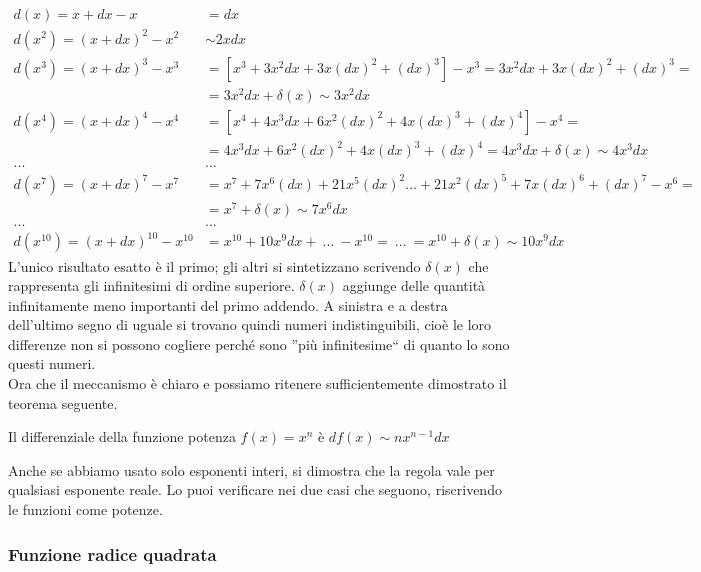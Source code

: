 \begin{align*}
  d(x)=x+dx-x & =dx\\
  d(x^2)=(x+dx)^2-x^2 & \sim 2xdx\\
  d(x^3)=(x+dx)^3-x^3 & =[x^3+3x^2dx+3x(dx)^2+(dx)^3]-x^3=
                      3x^2dx+3x(dx)^2+(dx)^3=\\
                      &= 3x^2dx+\delta(x)\sim 3x^2dx\\
  d(x^4)=(x+dx)^4-x^4 & = [x^4+4x^3dx+6x^2(dx)^2+4x(dx)^3+(dx)^4]-x^4=\\
                      &=4x^3dx+6x^2(dx)^2+4x(dx)^3+(dx)^4=
                      4x^3dx+\delta(x)\sim 4x^3dx\\
  ...                 & ...\\
  d(x^7)=(x+dx)^7-x^7 & = 
x^7+7x^6(dx)+21x^5(dx)^2...+21x^2(dx)^5+7x(dx)^6+(dx)^7 - x^6=\\
  & = x^7+\delta(x)\sim 7x^6dx\\
  ...                 & ...\\
  d(x^{10})=(x+dx)^{10}-x^{10} & =x^{10}+10 x^9dx+\ ...\ -x^{10}=
  \ ...\ =x^{10} +\delta(x)\sim 10 x^9dx      
\end{align*}
L'unico risultato esatto è il primo; gli altri si sintetizzano scrivendo 
$\delta(x)$
che rappresenta gli infinitesimi di ordine superiore. $\delta(x)$ aggiunge
delle quantità infinitamente meno importanti del primo addendo.
A sinistra e a destra dell'ultimo segno di uguale si trovano quindi 
numeri indistinguibili, cioè le loro differenze non si possono cogliere perché
sono ''più infinitesime`` di quanto lo sono questi numeri.\\

Ora che il meccanismo è chiaro e possiamo ritenere sufficientemente dimostrato
il teorema seguente.

\begin{teorema}
 Il differenziale della funzione potenza $f(x)=x^n$ è $df(x)\sim nx^{n-1}dx$
\end{teorema}

\begin{osservazione}
Anche se abbiamo usato solo esponenti interi, si dimostra che 
la regola vale per qualsiasi esponente reale. Lo puoi verificare nei due casi 
che seguono, riscrivendo le funzioni come potenze.
\end{osservazione}

\subsubsection{Funzione radice quadrata}
\label{subsubsec:diff01_diffradq}

